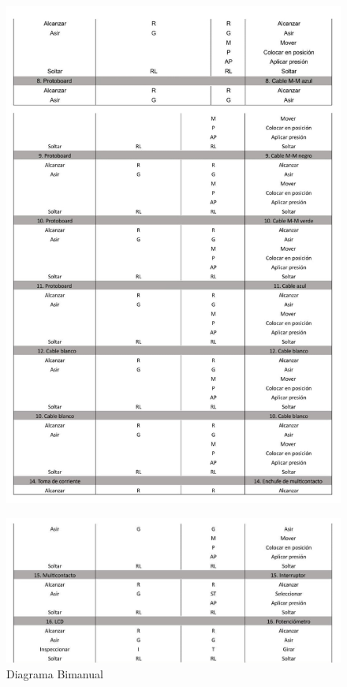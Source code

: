 \begin{figure}[H]
        \centering
        \includegraphics[trim = {0mm 0mm 0mm 0mm},clip,scale=0.2]{10/Img/diagramaBimanual2.jpg}
        \label{diagramaBimanual2}
    \end{figure}

\begin{figure}[H]
        \centering
        \includegraphics[trim = {0mm 0mm 0mm 0mm},clip,scale=0.2]{10/Img/diagramaBimanual3.jpg}
        \caption{Diagrama Bimanual}
        \label{diagramaBimanual3}
    \end{figure}
